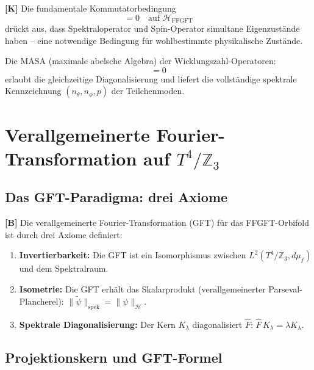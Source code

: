 \textbf{[K]} Die fundamentale Kommutatorbedingung
\begin{equation}
  [\hat{F}, \hat{S}] = 0 \quad \text{auf } \mathcal{H}_{\mathrm{FFGFT}}
  \label{eq:komm}
\end{equation}
drückt aus, dass Spektraloperator und Spin-Operator simultane
Eigenzustände haben -- eine notwendige Bedingung für
wohlbestimmte physikalische Zustände.

Die MASA (maximale abelsche Algebra) der Wicklungszahl-Operatoren:
\begin{equation}
  [\hat{n}_\theta, \hat{n}_\phi] = 0
  \label{eq:MASA}
\end{equation}
erlaubt die gleichzeitige Diagonalisierung und liefert die vollständige
spektrale Kennzeichnung $(n_\theta, n_\phi, p)$ der Teilchenmoden.

\section{Verallgemeinerte Fourier-Transformation auf $T^4/\mathbb{Z}_3$}

\subsection{Das GFT-Paradigma: drei Axiome}

\textbf{[B]} Die verallgemeinerte Fourier-Transformation (GFT) für
das FFGFT-Orbifold ist durch drei Axiome definiert:
\begin{enumerate}
  \item \textbf{Invertierbarkeit:} Die GFT ist ein Isomorphismus
    zwischen $L^2(T^4/\mathbb{Z}_3, d\mu_f)$ und dem Spektralraum.
  \item \textbf{Isometrie:} Die GFT erhält das Skalarprodukt
    (verallgemeinerter Parseval-Plancherel):
    $\|\tilde{\psi}\|_{\mathrm{spek}} = \|\psi\|_{\mathcal{H}}$.
  \item \textbf{Spektrale Diagonalisierung:} Der Kern $K_\lambda$
    diagonalisiert $\hat{F}$: $\hat{F}\,K_\lambda = \lambda K_\lambda$.
\end{enumerate}

\subsection{Projektionskern und GFT-Formel}

